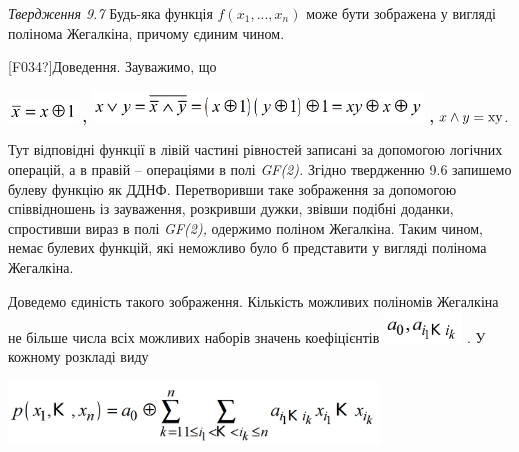 \documentclass[a4paper]{article}
\newcounter{}
\newcommand\normalsubformula[1]{\text{\mathversion{normal}$#1$}}
\begin{document}
\textit{Твердження 9.7}  Будь-яка функція 
${f(x_{{1}},\text{.}\text{.}\text{.},x_{{n}})}$ може бути зображена у вигляді
полінома Жегалкіна, причому єдиним чином.

\textlatin{[F034?]}Доведення. Зауважимо, що 

{\centering
 \includegraphics[width=0.728in,height=0.2161in]{crypt-img/crypt-img119.png}
\textbf{, }
\includegraphics[width=3.4709in,height=0.3228in]{crypt-img/crypt-img120.png}
\textbf{,  } ${x\wedge y=\normalsubformula{\text{xy}}}$.
\par}

Тут відповідні функції в лівій частині рівностей записані за допомогою логічних
операцій, а в правій – операціями в полі  \textit{GF(2).} Згідно твердженню
9.6\textit{ }запишемо\textit{ }булеву функцію як ДДНФ. Перетворивши таке
зображення за допомогою співвідношень із зауваження, розкривши дужки, звівши
подібні доданки, спростивши вираз  в полі \textit{GF(2)}\textit{, }одержимо
поліном Жегалкіна. Таким чином, немає булевих функцій, які неможливо було б
представити у вигляді полінома Жегалкіна.

Доведемо єдиність такого зображення. Кількість можливих поліномів Жегалкіна не
більше числа всіх можливих наборів значень коефіцієнтів 
\includegraphics[width=0.8154in,height=0.3307in]{crypt-img/crypt-img121.png} .
У кожному розкладі виду

{\centering 
\includegraphics[width=3.8752in,height=0.6661in]{crypt-img/crypt-img122.png}
\par}
\end{document}

